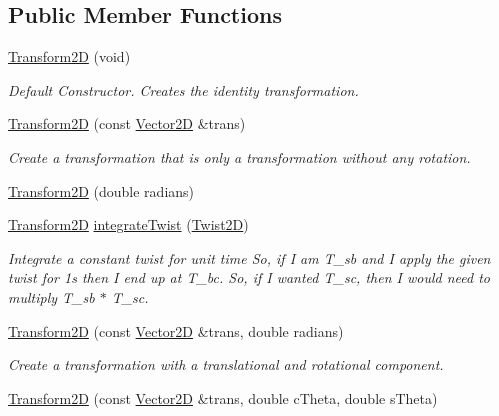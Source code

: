 \subsection*{Public Member Functions}
\begin{DoxyCompactItemize}
\item 
\mbox{\label{classrigid2d_1_1Transform2D_ac583ebfe4666feb4e42049ef0bf8ec3b}} 
\hyperlink{classrigid2d_1_1Transform2D_ac583ebfe4666feb4e42049ef0bf8ec3b}{Transform2D} (void)
\begin{DoxyCompactList}\small\item\em Default Constructor. Creates the identity transformation. \end{DoxyCompactList}\item 
\hyperlink{classrigid2d_1_1Transform2D_ab3e595da2315ed50ba8eb24ead0c8d78}{Transform2D} (const \hyperlink{structrigid2d_1_1Vector2D}{Vector2D} \&trans)
\begin{DoxyCompactList}\small\item\em Create a transformation that is only a transformation without any rotation. \end{DoxyCompactList}\item 
\hyperlink{classrigid2d_1_1Transform2D_a3f2f654cb039320e331931c0877b39a3}{Transform2D} (double radians)
\item 
\hyperlink{classrigid2d_1_1Transform2D}{Transform2D} \hyperlink{classrigid2d_1_1Transform2D_a9d0ba77785a63d6299fe0671d8280584}{integrate\+Twist} (\hyperlink{classrigid2d_1_1Twist2D}{Twist2D})
\begin{DoxyCompactList}\small\item\em Integrate a constant twist for unit time So, if I am T\+\_\+sb and I apply the given twist for 1s then I end up at T\+\_\+bc. So, if I wanted T\+\_\+sc, then I would need to multiply T\+\_\+sb $\ast$ T\+\_\+sc. \end{DoxyCompactList}\item 
\hyperlink{classrigid2d_1_1Transform2D_a47de6c24f25c57da553a0fdaf13e2138}{Transform2D} (const \hyperlink{structrigid2d_1_1Vector2D}{Vector2D} \&trans, double radians)
\begin{DoxyCompactList}\small\item\em Create a transformation with a translational and rotational component. \end{DoxyCompactList}\item 
\hyperlink{classrigid2d_1_1Transform2D_a85302460b333608ad9e37cdbd71b78ac}{Transform2D} (const \hyperlink{structrigid2d_1_1Vector2D}{Vector2D} \&trans, double c\+Theta, double s\+Theta)

\end{DoxyCompactItemize}
